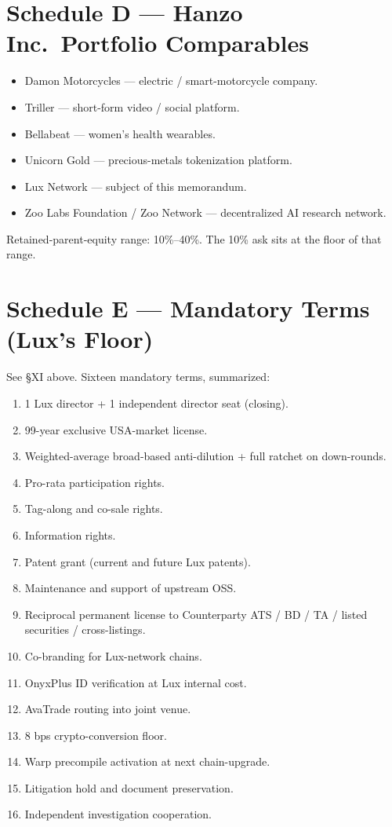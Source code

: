 \documentclass[11pt,letterpaper]{article}
\begin{document}
\section*{Schedule D --- Hanzo Inc.\ Portfolio Comparables}

\begin{itemize}[leftmargin=1.5em,itemsep=0.1em]
\item Damon Motorcycles --- electric / smart-motorcycle company.
\item Triller --- short-form video / social platform.
\item Bellabeat --- women's health wearables.
\item Unicorn Gold --- precious-metals tokenization platform.
\item Lux Network --- subject of this memorandum.
\item Zoo Labs Foundation / Zoo Network --- decentralized AI research network.
\end{itemize}

Retained-parent-equity range: 10\%--40\%. The 10\% ask sits at the
floor of that range.

\section*{Schedule E --- Mandatory Terms (Lux's Floor)}

See \S XI above. Sixteen mandatory terms, summarized:

\begin{enumerate}[leftmargin=1.5em,itemsep=0.05em]
\item 1 Lux director + 1 independent director seat (closing).
\item 99-year exclusive USA-market license.
\item Weighted-average broad-based anti-dilution + full ratchet
on down-rounds.
\item Pro-rata participation rights.
\item Tag-along and co-sale rights.
\item Information rights.
\item Patent grant (current and future Lux patents).
\item Maintenance and support of upstream OSS.
\item Reciprocal permanent license to Counterparty ATS / BD / TA /
listed securities / cross-listings.
\item Co-branding for Lux-network chains.
\item OnyxPlus ID verification at Lux internal cost.
\item AvaTrade routing into joint venue.
\item 8 bps crypto-conversion floor.
\item Warp precompile activation at next chain-upgrade.
\item Litigation hold and document preservation.
\item Independent investigation cooperation.
\end{enumerate}
\end{document}
